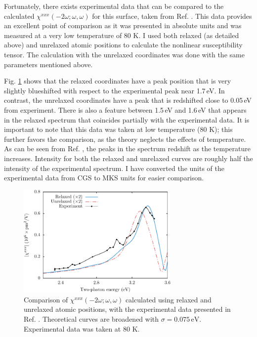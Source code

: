 Fortunately, there exists experimental data that can be compared to the
calculated $\chi^{xxx}(-2\omega;\omega,\omega)$ for this surface, taken from
Ref. \cite{hoferAPA96}. This data provides an excellent point of comparison as
it was presented in absolute units and was measured at a very low temperature of
80 K. I used both relaxed (as detailed above) and unrelaxed atomic positions to
calculate the nonlinear susceptibility tensor. The calculation with the
unrelaxed coordinates was done with the same parameters mentioned above.

Fig. \ref{fig:Xxxx} shows that the relaxed coordinates have a peak position that
is very slightly blueshifted with respect to the experimental peak near 1.7\,eV.
In contrast, the unrelaxed coordinates have a peak that is redshifted close to
0.05\,eV from experiment. There is also a feature between 1.5\,eV and 1.6\,eV
that appears in the relaxed spectrum that coincides partially with the
experimental data. It is important to note that this data was taken at low
temperature (80 K); this further favors the comparison, as the theory neglects
the effects of temperature. As can be seen from Ref. \cite{hoferAPA96}, the
peaks in the spectrum redshift as the temperature increases. Intensity for both
the relaxed and unrelaxed curves are roughly half the intensity of the
experimental spectrum. I have converted the units of the experimental data from
CGS to MKS units for easier comparison.

\begin{figure}
\centering
\includegraphics[width=0.7\textwidth]{content/figures/fig-4_3_01}
\caption{Comparison of
$\chi^{xxx}(-2\omega;\omega,\omega)$ calculated using relaxed and unrelaxed
atomic positions, with the experimental data presented in Ref.
\cite{hoferAPA96}. Theoretical curves are broadened with
$\sigma=0.075\,\text{eV}$. Experimental data was taken at 80 K.}
\label{fig:Xxxx}
\end{figure}

